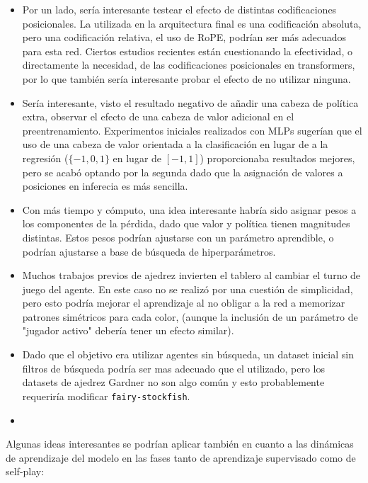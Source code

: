 \documentclass[12pt, a4paper]{article}
\begin{document}
\begin{itemize}
    \item Por un lado, sería interesante testear el efecto de distintas codificaciones posicionales. La utilizada en la arquitectura final es una codificación absoluta, pero una codificación relativa, el uso de RoPE, podrían ser más adecuados para esta red. Ciertos estudios recientes están cuestionando la efectividad, o directamente la necesidad, de las codificaciones posicionales en transformers, por lo que también sería interesante probar el efecto de no utilizar ninguna.
    \item Sería interesante, visto el resultado negativo de añadir una cabeza de política extra, observar el efecto de una cabeza de valor adicional en el preentrenamiento. Experimentos iniciales realizados con MLPs sugerían que el uso de una cabeza de valor orientada a la clasificación en lugar de a la regresión ($\{-1,0,1\}$ en lugar de $[-1,1]$) proporcionaba resultados mejores, pero se acabó optando por la segunda dado que la asignación de valores a posiciones en inferecia es más sencilla.
    \item Con más tiempo y cómputo, una idea interesante habría sido asignar pesos a los componentes de la pérdida, dado que valor y política tienen magnitudes distintas. Estos pesos podrían ajustarse con un parámetro aprendible, o podrían ajustarse a base de búsqueda de hiperparámetros.
    \item Muchos trabajos previos de ajedrez invierten el tablero al cambiar el turno de juego del agente. En este caso no se realizó por una cuestión de simplicidad, pero esto podría mejorar el aprendizaje al no obligar a la red a memorizar patrones simétricos para cada color, (aunque la inclusión de un parámetro de "jugador activo" debería tener un efecto similar).
    \item Dado que el objetivo era utilizar agentes sin búsqueda, un dataset inicial sin filtros de búsqueda podría ser mas adecuado que el utilizado, pero los datasets de ajedrez Gardner no son algo común y esto probablemente requeriría modificar \texttt{fairy-stockfish}.
    \item 
\end{itemize}

Algunas ideas interesantes se podrían aplicar también en cuanto a las dinámicas de aprendizaje del modelo en las fases tanto de aprendizaje supervisado como de self-play:
\end{document}
